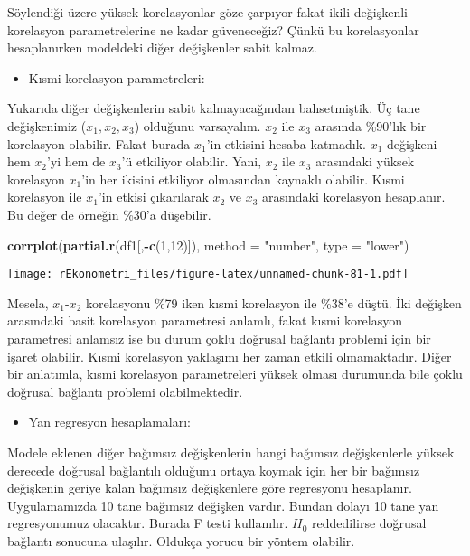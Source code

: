 \documentclass[
]{book}
\newenvironment{Shaded}{\begin{snugshade}}{\end{snugshade}}
\newcommand{\DataTypeTok}[1]{\textcolor[rgb]{0.13,0.29,0.53}{#1}}
\newcommand{\DecValTok}[1]{\textcolor[rgb]{0.00,0.00,0.81}{#1}}
\newcommand{\KeywordTok}[1]{\textcolor[rgb]{0.13,0.29,0.53}{\textbf{#1}}}
\newcommand{\NormalTok}[1]{#1}
\newcommand{\OperatorTok}[1]{\textcolor[rgb]{0.81,0.36,0.00}{\textbf{#1}}}
\newcommand{\StringTok}[1]{\textcolor[rgb]{0.31,0.60,0.02}{#1}}
\providecommand{\tightlist}{%
  \setlength{\itemsep}{0pt}\setlength{\parskip}{0pt}}
\begin{document}
Söylendiği üzere yüksek korelasyonlar göze çarpıyor fakat ikili değişkenli korelasyon parametrelerine ne kadar güveneceğiz? Çünkü bu korelasyonlar hesaplanırken modeldeki diğer değişkenler sabit kalmaz.

\begin{itemize}
\tightlist
\item
  Kısmi korelasyon parametreleri:
\end{itemize}

Yukarıda diğer değişkenlerin sabit kalmayacağından bahsetmiştik. Üç tane değişkenimiz (\(x_1, x_2, x_3\)) olduğunu varsayalım. \(x_2\) ile \(x_3\) arasında \%90'lık bir korelasyon olabilir. Fakat burada \(x_1\)'in etkisini hesaba katmadık. \(x_1\) değişkeni hem \(x_2\)'yi hem de \(x_3\)'ü etkiliyor olabilir. Yani, \(x_2\) ile \(x_3\) arasındaki yüksek korelasyon \(x_1\)'in her ikisini etkiliyor olmasından kaynaklı olabilir. Kısmi korelasyon ile \(x_1\)'in etkisi çıkarılarak \(x_2\) ve \(x_3\) arasındaki korelasyon hesaplanır. Bu değer de örneğin \%30'a düşebilir.

\begin{Shaded}
\begin{Highlighting}[]
\KeywordTok{corrplot}\NormalTok{(}\KeywordTok{partial.r}\NormalTok{(df1[,}\OperatorTok{-}\KeywordTok{c}\NormalTok{(}\DecValTok{1}\NormalTok{,}\DecValTok{12}\NormalTok{)]), }\DataTypeTok{method =} \StringTok{"number"}\NormalTok{, }\DataTypeTok{type =} \StringTok{"lower"}\NormalTok{)}
\end{Highlighting}
\end{Shaded}

\texttt{[image: rEkonometri\_files/figure-latex/unnamed-chunk-81-1.pdf]}

Mesela, \(x_1\)-\(x_2\) korelasyonu \%79 iken kısmi korelasyon ile \%38'e düştü. İki değişken arasındaki basit korelasyon parametresi anlamlı, fakat kısmi korelasyon parametresi anlamsız ise bu durum çoklu doğrusal bağlantı problemi için bir işaret olabilir. Kısmi korelasyon yaklaşımı her zaman etkili olmamaktadır. Diğer bir anlatımla, kısmi korelasyon parametreleri yüksek olması durumunda bile çoklu doğrusal bağlantı problemi olabilmektedir.

\begin{itemize}
\tightlist
\item
  Yan regresyon hesaplamaları:
\end{itemize}

Modele eklenen diğer bağımsız değişkenlerin hangi bağımsız değişkenlerle yüksek derecede doğrusal bağlantılı olduğunu ortaya koymak için her bir bağımsız değişkenin geriye kalan bağımsız değişkenlere göre regresyonu hesaplanır. Uygulamamızda 10 tane bağımsız değişken vardır. Bundan dolayı 10 tane yan regresyonumuz olacaktır. Burada F testi kullanılır. \(H_0\) reddedilirse doğrusal bağlantı sonucuna ulaşılır. Oldukça yorucu bir yöntem olabilir.
\end{document}
